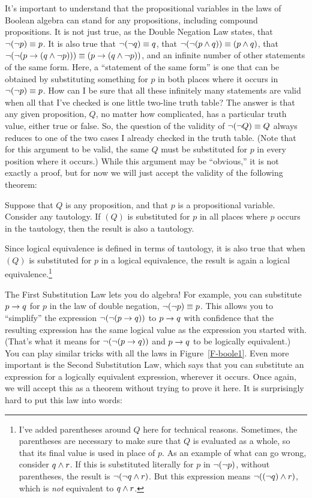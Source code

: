 It's important to understand that the propositional variables in
the laws of Boolean algebra can stand for any propositions, including
compound propositions.  
It is not just true, as the Double Negation Law states,
that $\lnot(\lnot p)\equiv p$.  It is also
true that $\lnot(\lnot q)\equiv q$, that $\lnot(\lnot(p\wedge q))\equiv (p\wedge q)$,
that $\lnot(\lnot(p\rightarrow(q\wedge \lnot p)))\equiv(p\rightarrow (q\wedge\lnot p))$,
and an infinite number of other statements of the same form.  Here,
a ``statement of the same form'' is one that can be obtained by
substituting something for $p$ in both places where it occurs in $\lnot(\lnot p)\equiv p$.
How can I be sure that all these infinitely many statements are valid when
all that I've checked is one little two-line truth table?  The
answer is that any given proposition, $Q$, no matter how complicated,
has a particular truth
value, either true or false.  So, the question of the validity
of $\lnot(\lnot Q)\equiv Q$ always reduces to one of the two cases
I already checked in the truth table.  (Note that for this argument
to be valid, the same $Q$ must be substituted for $p$ in every 
position where it occurs.)  While this argument may be
``obvious,'' it is not exactly a proof, but for now we will just
accept the validity of the following theorem:

\begin{theorem}\label{T-sub1}
Suppose that $Q$ is any proposition, and that $p$ is a propositional
variable.  Consider any tautology.  If $(Q)$ is substituted
for $p$ in all places where $p$ occurs in the tautology,
then the result is also a tautology.
\end{theorem}

Since logical equivalence is defined in terms of tautology,
it is also true that when $(Q)$ is substituted for $p$ in a logical equivalence,
the result is again a logical equivalence.\footnote{I've added parentheses around 
$Q$ here for technical reasons. Sometimes, the parentheses are necessary
to make sure that $Q$ is evaluated as a whole, so that its final value is used in place
of $p$.  As an example of what can go wrong, consider $q\wedge r$.  If this is
substituted literally for $p$ in $\lnot(\lnot p)$, without
parentheses, the result is $\lnot(\lnot q \wedge r)$.  But this expression
means $\lnot((\lnot q)\wedge r)$, which is \emph{not} equivalent to
$q\wedge r$.}

The First Substitution Law lets you do algebra!  For example, you
can substitute $p\rightarrow q$ for $p$ in the law of double negation, $\lnot(\lnot p)\equiv p$.
This allows you
to ``simplify'' the expression $\lnot(\lnot(p\rightarrow q))$ to $p\rightarrow q$
with confidence that the resulting expression has the same logical
value as the expression you started with.  (That's what it means for
$\lnot(\lnot(p\rightarrow q))$ and $p\rightarrow q$ to be logically equivalent.)
You can play similar tricks with all the laws in Figure~\ref{F-boole1}.
Even more important is the Second Substitution Law, which says
that you can substitute an expression for a logically equivalent
expression, wherever it occurs.  Once again, we will accept this
as a theorem without trying to prove it here.  It is surprisingly
hard to put this law into words:

